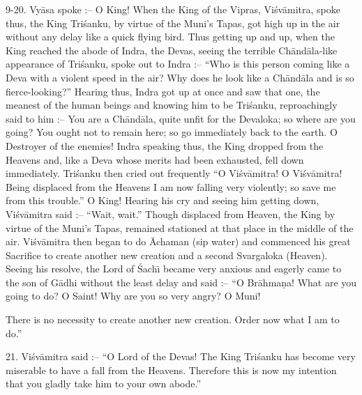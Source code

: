 9-20. Vy\=asa spoke :-- O King! When the King of the Vipras, Vi\'sv\=amitra, spoke thus, the King Tri\'sanku, by virtue of the Muni's Tapas, got high up in the air without any delay like a quick flying bird. Thus getting up and up, when the King reached the abode of Indra, the Devas, seeing the terrible Ch\=and\=ala-like appearance of Tri\'sanku, spoke out to Indra :-- ``Who is this person coming like a Deva with a violent speed in the air? Why does he look like a Ch\=and\=ala and is so fierce-looking?'' Hearing thus, Indra got up at once and saw that one, the meanest of the human beings and knowing him to be Tri\'sanku, reproachingly said to him :-- You are a Ch\=and\=ala, quite unfit for the Devaloka; so where are you going? You ought not to remain here; so go immediately back to the earth. O Destroyer of the enemies! Indra speaking thus, the King dropped from the Heavens and, like a Deva whose merits had been exhausted, fell down immediately. Tri\'sanku then cried out frequently ``O Vi\'sv\=amitra! O Vi\'sv\=amitra! Being displaced from the Heavens I am now falling very violently; so save me from this trouble.'' O King! Hearing his cry and seeing him getting down, Vi\'sv\=amitra said :-- ``Wait, wait.'' Though displaced from Heaven, the King by virtue of the Muni's Tapas, remained stationed at that place in the middle of the air. Vi\'sv\=amitra then began to do \=Achaman (sip water) and commenced his great Sacrifice to create another new creation and a second Svargaloka (Heaven). Seeing his resolve, the Lord of \'Sach\={\i} became very anxious and eagerly came to the son of G\=adhi without the least delay and said :-- ``O Br\=ahma\d{n}a! What are you going to do? O Saint! Why are you so very angry? O Muni!

There is no necessity to create another new creation. Order now what I am to do.''

21. Vi\'sv\=amitra said :-- ``O Lord of the Devas! The King Tri\'sanku has become very miserable to have a fall from the Heavens. Therefore this is now my intention that you gladly take him to your own abode.''

